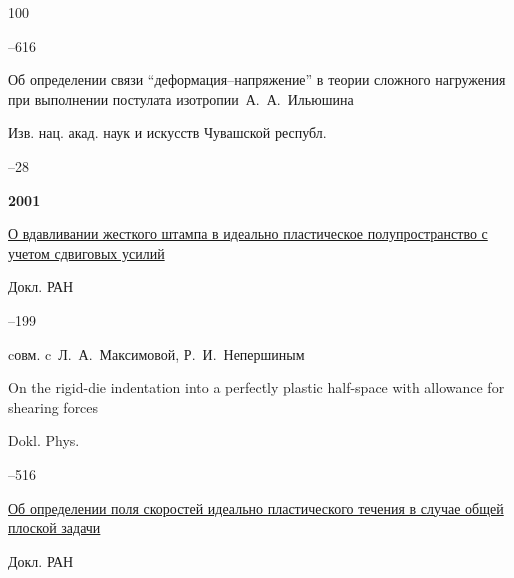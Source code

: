 \begin{thebibliography}{100}



--616






\paper Об определении связи ``деформация–напряжение'' в теории сложного нагружения при выполнении постулата изотропии~А.~А.~Ильюшина 

\jour Изв. нац. акад. наук и искусств Чувашской республ. 



–28



\item[] \centerline{\bf 2001}




\paper \href{http://mi.mathnet.ru/dan16894}{О вдавливании жесткого штампа в идеально пластическое полупространство с учетом сдвиговых усилий}

\jour Докл. РАН




--199


\miscnote cовм. c~Л.~А.~Максимовой, Р.~И.~Непершиным

\transl

\paper On the rigid-die indentation into a perfectly plastic half-space with allowance for shearing forces

\jour Dokl. Phys. 




--516








\paper \href{http://mi.mathnet.ru/dan16787}{Об определении поля скоростей идеально пластического течения в случае общей плоской задачи}

\jour Докл. РАН


\end{thebibliography}
